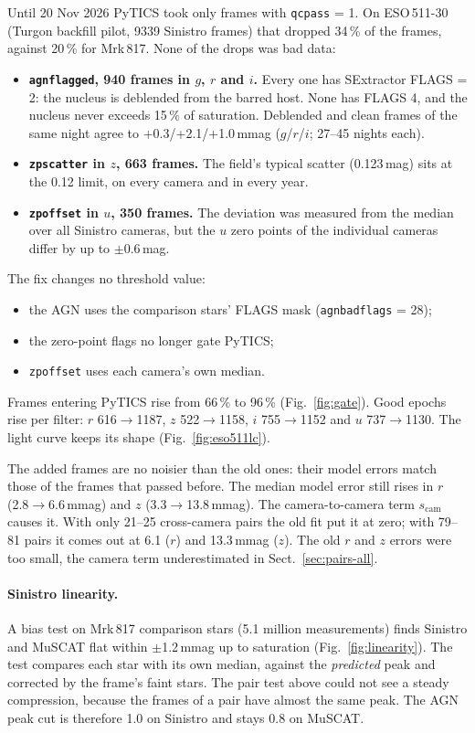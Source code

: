 \documentclass[10pt,a4paper,oneside]{report}
\renewcommand{\_}{\oldunderscore\allowbreak}
\begin{document}
Until 20 Nov 2026 PyTICS took only frames with \texttt{qc\_pass} = 1. On ESO\,511-30 (Turgon backfill
pilot, 9339 Sinistro frames) that dropped 34\,\% of the frames, against 20\,\% for Mrk\,817. None of the drops
was bad data:
\begin{itemize}
  \item \textbf{\texttt{agn\_flagged}, 940 frames in $g$, $r$ and $i$.} Every one has SExtractor FLAGS = 2: the
        nucleus is deblended from the barred host. None has FLAGS 4, and the nucleus never exceeds 15\,\% of
        saturation. Deblended and clean frames of the same night agree to +0.3/+2.1/+1.0\,mmag
        ($g$/$r$/$i$; 27--45 nights each).
  \item \textbf{\texttt{zp\_scatter} in $z$, 663 frames.} The field's typical scatter (0.123\,mag) sits at the
        0.12 limit, on every camera and in every year.
  \item \textbf{\texttt{zp\_offset} in $u$, 350 frames.} The deviation was measured from the median over all
        Sinistro cameras, but the $u$ zero points of the individual cameras differ by up to $\pm$0.6\,mag.
\end{itemize}

The fix changes no threshold value:
\begin{itemize}
  \item the AGN uses the comparison stars' FLAGS mask (\texttt{agn\_bad\_flags} = 28);
  \item the zero-point flags no longer gate PyTICS;
  \item \texttt{zp\_offset} uses each camera's own median.
\end{itemize}
Frames entering PyTICS rise from 66\,\% to 96\,\% (Fig.~\ref{fig:gate}). Good epochs rise per filter:
$r$ 616$\to$1187, $z$ 522$\to$1158, $i$ 755$\to$1152 and $u$ 737$\to$1130. The light curve keeps its shape
(Fig.~\ref{fig:eso511lc}).

The added frames are no noisier than the old ones: their model errors match those of the frames that passed
before. The median model error still rises in $r$ (2.8$\to$6.6\,mmag) and $z$ (3.3$\to$13.8\,mmag). The
camera-to-camera term $s_\mathrm{cam}$ causes it. With only 21--25 cross-camera pairs the old fit put it at
zero; with 79--81 pairs it comes out at 6.1 ($r$) and 13.3\,mmag ($z$). The old $r$ and $z$ errors were too
small, the camera term underestimated in Sect.~\ref{sec:pairs-all}.

\paragraph{Sinistro linearity.} A bias test on Mrk\,817 comparison stars (5.1 million measurements) finds
Sinistro and MuSCAT flat within $\pm$1.2\,mmag up to saturation (Fig.~\ref{fig:linearity}). The test
compares each star with its own median, against the \emph{predicted} peak and corrected by the frame's faint
stars. The pair test above could not see a steady compression, because the frames of a pair have almost the
same peak. The AGN peak cut is therefore 1.0 on Sinistro and stays 0.8 on MuSCAT.
\end{document}

